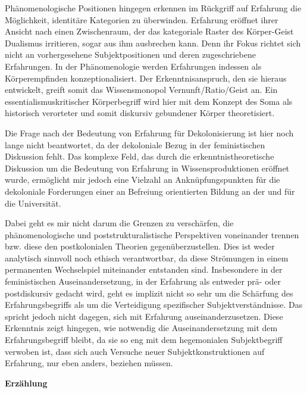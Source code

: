 Phänomenologische Positionen hingegen erkennen im Rückgriff auf Erfahrung die
Möglichkeit, identitäre Kategorien zu überwinden. Erfahrung eröffnet ihrer
Ansicht nach einen Zwischenraum, der das kategoriale Raster des Körper-Geist
Dualismus irritieren, sogar aus ihm ausbrechen kann. Denn ihr Fokus richtet sich
nicht an vorhergesehene Subjektpositionen und deren zugeschriebene Erfahrungen.
In der Phänomenologie werden Erfahrungen indessen als Körperempfinden
konzeptionalisiert. Der Erkenntnisanspruch, den sie hieraus entwickelt, greift
somit das Wissensmonopol Vernunft/Ratio/Geist an. Ein essentialismuskritischer
Körperbegriff wird hier mit dem Konzept des Soma als historisch verorteter und
somit diskursiv gebundener Körper theoretisiert.

Die Frage nach der Bedeutung von Erfahrung für Dekolonisierung ist hier noch
lange nicht beantwortet, da der dekoloniale Bezug in der feministischen
Diskussion fehlt. Das komplexe Feld, das durch die erkenntnistheoretische
Diskussion um die Bedeutung von Erfahrung in Wissensproduktionen eröffnet wurde,
ermöglicht mir jedoch  eine Vielzahl an Anknüpfungspunkten für die dekoloniale
Forderungen einer an Befreiung orientierten Bildung an der und für die
Universität.

Dabei geht es mir nicht darum die Grenzen zu verschärfen, die phänomenologische
und poststrukturalistische Perspektiven voneinander trennen bzw. diese den
postkolonialen Theorien gegenüberzustellen. Dies ist weder analytisch sinnvoll
noch ethisch verantwortbar, da diese Strömungen in einem permanenten
Wechselspiel miteinander entstanden sind. Insbesondere in der feministischen
Auseinandersetzung, in der Erfahrung als entweder prä- oder postdiskursiv
gedacht wird, geht es implizit nicht so sehr um die Schärfung des
Erfahrungsbegriffs als um die Verteidigung spezifischer Subjektverständnisse.
Das spricht jedoch nicht dagegen, sich mit Erfahrung auseinanderzusetzen. Diese
Erkenntnis zeigt hingegen, wie notwendig die Auseinandersetzung mit dem
Erfahrungsbegriff bleibt, da sie so eng mit dem hegemonialen Subjektbegriff
verwoben ist, dass sich auch Versuche neuer Subjektkonstruktionen auf Erfahrung,
nur eben anders,  beziehen müssen.


\textbf{\large Erzählung}\\

